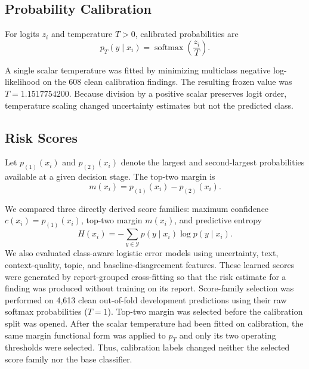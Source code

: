 \documentclass[11pt]{article}
\begin{document}
\subsection{Probability Calibration}

For logits $z_i$ and temperature $T>0$, calibrated probabilities are
\begin{equation}
  p_T(y\mid x_i)=\operatorname{softmax}\!\left(\frac{z_i}{T}\right).
  \label{eq:temperature}
\end{equation}

A single scalar temperature was fitted by minimizing multiclass negative
log-likelihood on the 608 clean calibration findings. The resulting frozen value
was $T=1.1517754200$. Because division by a positive scalar preserves logit order,
temperature scaling changed uncertainty estimates but not the predicted class.

\subsection{Risk Scores}

Let $p_{(1)}(x_i)$ and $p_{(2)}(x_i)$ denote the largest and second-largest
probabilities available at a given decision stage. The top-two margin is
\begin{equation}
  m(x_i)=p_{(1)}(x_i)-p_{(2)}(x_i).
  \label{eq:margin}
\end{equation}

We compared three directly derived score families: maximum confidence
$c(x_i)=p_{(1)}(x_i)$, top-two margin $m(x_i)$, and predictive entropy
\begin{equation}
  H(x_i)=-\sum_{y\in\mathcal{Y}}p(y\mid x_i)\log p(y\mid x_i).
\end{equation}
We also evaluated class-aware logistic error models using uncertainty, text,
context-quality, topic, and baseline-disagreement features. These learned scores
were generated by report-grouped cross-fitting so that the risk estimate for a
finding was produced without training on its report. Score-family selection was
performed on 4,613 clean out-of-fold development predictions using their raw
softmax probabilities ($T=1$). Top-two margin was selected before the calibration
split was opened. After the scalar temperature had been fitted on calibration,
the same margin functional form was applied to $p_T$ and only its two operating
thresholds were selected. Thus, calibration labels changed neither the selected
score family nor the base classifier.
\end{document}
